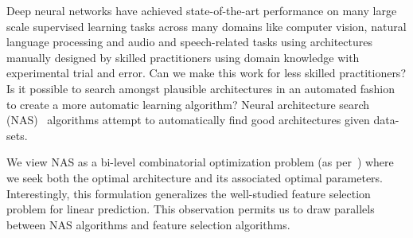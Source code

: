 

Deep neural networks have achieved state-of-the-art performance on
many large scale supervised learning tasks across many domains like
computer vision, natural language processing and audio and
speech-related tasks using architectures manually designed by skilled
practitioners using domain knowledge with experimental trial and
error.  Can we make this work for less skilled practitioners?  Is it
possible to search amongst plausible architectures in an automated
fashion to create a more automatic learning algorithm?  Neural
architecture search (NAS)~\citep{nas} algorithms attempt to
automatically find good architectures given data-sets.

We view NAS 
as a bi-level combinatorial optimization problem (as per~\citep{Liu2018DARTSDA}) where we seek both the optimal architecture 
and its associated optimal parameters.  Interestingly, this formulation 
generalizes the well-studied feature selection problem for linear prediction. 
This observation permits us to draw parallels between NAS algorithms 
and feature selection algorithms. 


